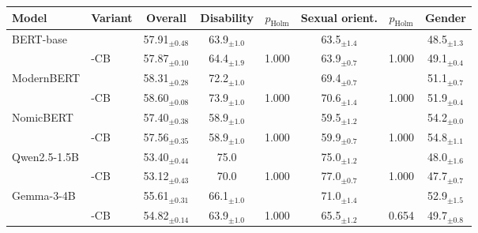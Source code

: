   \footnotesize\setlength{\tabcolsep}{4pt}
  \begin{tabular}{@{}llcccccc@{}}
    \toprule
    Model & Variant & Overall & Disability & $p_{\mathrm{Holm}}$ & Sexual orient. & $p_{\mathrm{Holm}}$ & Gender \\
    \midrule
    BERT-base & \PEAT{} & 57.91$_{\pm 0.48}$ & 63.9$_{\pm 1.0}$ &  & 63.5$_{\pm 1.4}$ &  & 48.5$_{\pm 1.3}$ \\
     & \PEAT{}-CB & 57.87$_{\pm 0.10}$ & 64.4$_{\pm 1.9}$ & 1.000 & 63.9$_{\pm 0.7}$ & 1.000 & 49.1$_{\pm 0.4}$ \\
    ModernBERT & \PEAT{} & 58.31$_{\pm 0.28}$ & 72.2$_{\pm 1.0}$ &  & 69.4$_{\pm 0.7}$ &  & 51.1$_{\pm 0.7}$ \\
     & \PEAT{}-CB & 58.60$_{\pm 0.08}$ & 73.9$_{\pm 1.0}$ & 1.000 & 70.6$_{\pm 1.4}$ & 1.000 & 51.9$_{\pm 0.4}$ \\
    NomicBERT & \PEAT{} & 57.40$_{\pm 0.38}$ & 58.9$_{\pm 1.0}$ &  & 59.5$_{\pm 1.2}$ &  & 54.2$_{\pm 0.0}$ \\
     & \PEAT{}-CB & 57.56$_{\pm 0.35}$ & 58.9$_{\pm 1.0}$ & 1.000 & 59.9$_{\pm 0.7}$ & 1.000 & 54.8$_{\pm 1.1}$ \\
    Qwen2.5-1.5B & \PEAT{} & 53.40$_{\pm 0.44}$ & 75.0 &  & 75.0$_{\pm 1.2}$ &  & 48.0$_{\pm 1.6}$ \\
     & \PEAT{}-CB & 53.12$_{\pm 0.43}$ & 70.0 & 1.000 & 77.0$_{\pm 0.7}$ & 1.000 & 47.7$_{\pm 0.7}$ \\
    Gemma-3-4B & \PEAT{} & 55.61$_{\pm 0.31}$ & 66.1$_{\pm 1.0}$ &  & 71.0$_{\pm 1.4}$ &  & 52.9$_{\pm 1.5}$ \\
     & \PEAT{}-CB & 54.82$_{\pm 0.14}$ & 63.9$_{\pm 1.0}$ & 1.000 & 65.5$_{\pm 1.2}$ & 0.654 & 49.7$_{\pm 0.8}$ \\
    \bottomrule
  \end{tabular}
